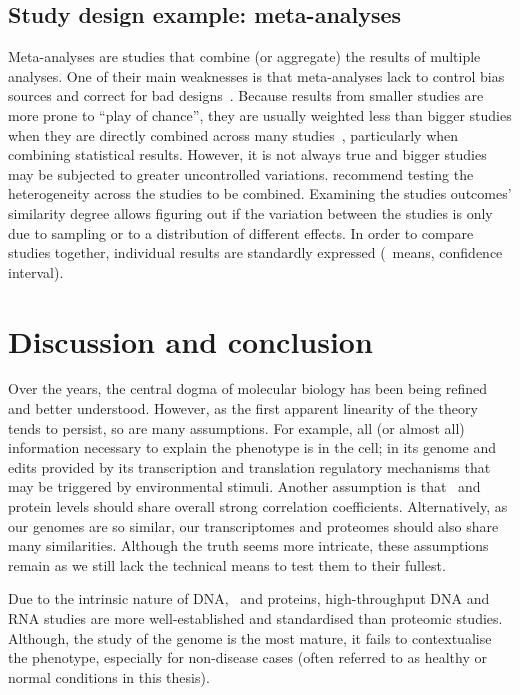 \subsection{Study design example: meta-analyses}

Meta-analyses are studies that combine (or aggregate) the results of multiple analyses.
One of their main weaknesses is
that meta-analyses lack
to control bias sources and correct for bad designs~.
Because results from smaller studies are more prone to \enquote{play of chance},
they are usually weighted less than bigger studies
when they are directly combined across many studies~,
particularly when combining statistical results.
However, it is not always true and bigger studies may be subjected
to greater uncontrolled variations.
\citet{Egger1997-ny} recommend testing the heterogeneity across the studies
to be combined.
Examining the studies outcomes' similarity degree allows figuring out
if the variation between the studies is only due to sampling or
to a distribution of different effects.
In order to compare studies together,
individual results are standardly expressed
(\eg\ means, confidence interval).


\section{Discussion and conclusion}\label{sec:bgConcl}

Over the years, the central dogma of molecular biology
has been being refined and better understood.
However, as the first apparent linearity of the theory tends to persist,
so are many assumptions.
For example,
all (or almost all) information necessary to explain the \gls{phenotype} is in the cell;
in its genome and edits provided by
its transcription and translation regulatory mechanisms
that may be triggered by environmental stimuli.
Another assumption is that
\mRNA\ and protein levels should share overall strong correlation coefficients.
Alternatively, as our genomes are so similar,
our transcriptomes and proteomes should also share many similarities.
Although the truth seems more intricate,
these assumptions remain
as we still lack the technical means to test them to their fullest.

Due to the intrinsic nature of \gls{DNA}, \mRNAs\ and proteins,
high-throughput \gls{DNA} and \gls{RNA} studies are more well-established
and standardised than proteomic studies.
Although, the study of the genome is the most mature,
it fails to contextualise the phenotype,
especially for non-disease cases
(often referred to as healthy or normal conditions in this thesis).

